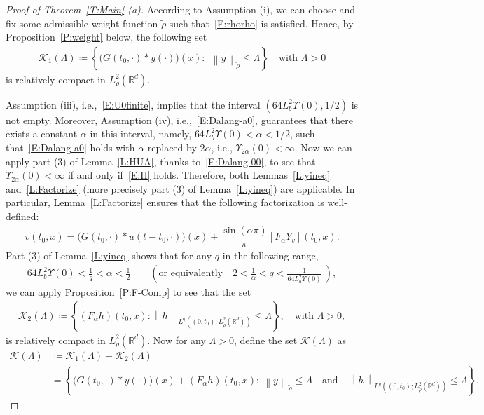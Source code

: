 \documentclass[a4paper,11pt]{article}%
\theoremstyle{plain}
\theoremstyle{definition}
\numberwithin{equation}{section}
\newcommand{\R}{\mathbb{R}}
\newcommand{\Norm}[1]{\left\| #1 \right\|}
\begin{document}
\begin{proof}[Proof of Theorem~\ref{T:Main} (a)]
  According to Assumption (i), we can choose and fix some admissible weight function $\tilde{\rho}$
  such that~\eqref{E:rhorho} is satisfied. Hence, by Proposition~\ref{P:weight} below, the following
  set
  \begin{align*}
    \mathscr{K}_1 (\Lambda) \coloneqq \left\{\big(G(t_0,\cdot)*y(\cdot)\big)(x): \:\:\Norm{y}_{\tilde{\rho}} \le \Lambda \right\}
    \quad \text{with $\Lambda>0$}
  \end{align*}
  is relatively compact in $L_\rho^2 (\R^d)$.

  Assumption (iii), i.e.,~\eqref{E:U0finite}, implies that the interval $\left(64L_b^2 \Upsilon(0),
  1/2\right)$ is not empty. Moreover, Assumption (iv), i.e.,~\eqref{E:Dalang-a0}, guarantees that
  there exists a constant $\alpha$ in this interval, namely, $64L_b^2\Upsilon(0) <\alpha<1/2$, such
  that~\eqref{E:Dalang-a0} holds with $\alpha$ replaced by $2\alpha$, i.e.,
  $\Upsilon_{2\alpha}(0)<\infty$. Now we can apply part (3) of Lemma~\ref{L:HUA}, thanks
  to~\eqref{E:Dalang-00}, to see that $\Upsilon_{2\alpha}(0)<\infty$ if and only if~\eqref{E:H}
  holds. Therefore, both Lemmas~\ref{L:yineq} and~\ref{L:Factorize} (more precisely part (3) of
  Lemma~\ref{L:yineq}) are applicable. In particular, Lemma~\ref{L:Factorize} ensures that the
  following factorization is well-defined:
  \begin{align}\label{E:Fact}
    v(t_0,x) = \Big(G(t_0,\cdot) * u(t-t_0,\cdot)\Big)(x) +\dfrac{\sin(\alpha \pi)}{\pi} \left[F_\alpha Y_v\right](t_0,x).
  \end{align}
  Part (3) of Lemma~\ref{L:yineq} shows that for any $q$ in the following range,
  \begin{align}\label{E:Choice}
    64 L_b^2 \Upsilon(0) < \frac{1}{q} < \alpha <\frac{1}{2}
    \qquad \left(\text{or equivalently} \quad
    2< \frac{1}{\alpha} < q < \frac{1}{64 L_b^2 \Upsilon(0)}\:\right),
  \end{align}
  we can apply Proposition~\ref{P:F-Comp} to see that the set
  \begin{align*}
    \mathscr{K}_2 (\Lambda)\coloneqq
    \left\{(F_\alpha h)(t_0,x): \Norm{h}_{L^q\left((0,t_0);L^2_{\tilde{\rho}}\left(\R^d\right)\right)} \le \Lambda \right\},
    \quad \text{with $\Lambda>0$},
  \end{align*}
  is relatively compact in $L_\rho^2 (\R^d)$. Now for any $\Lambda>0$, define the set $\mathscr{K}
  (\Lambda)$ as
  \begin{align*}
    \mathscr{K} (\Lambda)
    & \coloneqq \mathscr{K}_1 (\Lambda) + \mathscr{K}_2 (\Lambda) \\
    & = \left\{\big(G(t_0,\cdot)*y(\cdot)\big)(x)+(F_\alpha h)(t_0, x): \:\Norm{y}_{\tilde{\rho}}
    \le \Lambda \quad \text{and}\quad\Norm{h}_{L^q\left((0,t_0);L^2_{\tilde{\rho}}\left(\R^d\right)\right)} \le \Lambda \right\}.
  \end{align*}


\end{proof}
\end{document}
